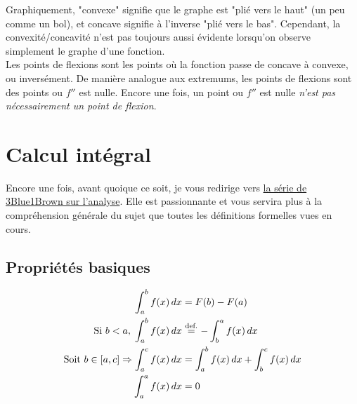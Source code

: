 \documentclass{article}
\newcommand\eqdef{\; \stackrel{ \mathclap{ \normalfont\text{def.} } }{ = } \;} %
\begin{document}
Graphiquement, "convexe" signifie que le graphe est "plié vers le haut" (un peu comme un bol), et concave signifie à l'inverse "plié vers le bas". Cependant, la convexité/concavité n'est pas toujours aussi évidente lorsqu'on observe simplement le graphe d'une fonction. \\

Les points de flexions sont les points où la fonction passe de concave à convexe, ou inversément. De manière analogue aux extremums, les points de flexions sont des points ou \(f''\) est nulle. Encore une fois, un point ou \(f''\) est nulle \emph{n'est pas nécessairement un point de flexion}. \\

\section{Calcul intégral}
Encore une fois, avant quoique ce soit, je vous redirige vers \href{https://www.youtube.com/playlist?list=PLZHQObOWTQDMsr9K-rj53DwVRMYO3t5Yr}{la série de 3Blue1Brown sur l'analyse}. Elle est passionnante et vous servira plus à la compréhension générale du sujet que toutes les définitions formelles vues en cours. 

\subsection{Propriétés basiques}
\begin{align*}
	\int_a^b f(x) \, dx &= F(b) - F(a) \\
	\text{Si } b < a, \; \int_a^b f(x) \, dx &\eqdef -\int_b^a f(x) \, dx \\
	\text{Soit } b \in \left[a, c\right] \Rightarrow \int_a^c f(x) \, dx &= \int_a^b f(x) \, dx + \int_b^c f(x) \, dx \\
	\int_a^a f(x) \, dx &= 0
\end{align*}
\end{document}
